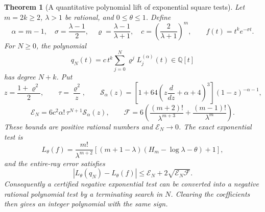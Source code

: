 \documentclass[11pt,a4paper]{article}
\newtheorem{theorem}{Theorem}[section]
\theoremstyle{definition}
\theoremstyle{remark}
\begin{document}
\begin{theorem}[A quantitative polynomial lift of exponential square tests]
\label{sea-square-exponential-lift}
Let $m=2k\ge2$, $\lambda>1$ be rational, and $0\le\theta\le1$.  Define
\[
 \alpha=m-1,\quad \sigma=\frac{\lambda-1}{2},\quad
 \varrho=\frac{\lambda-1}{\lambda+1},\quad
 c=\left(\frac{2}{\lambda+1}\right)^m,
 \qquad f(t)=t^k e^{-\sigma t}.
\]
For $N\ge0$, the polynomial
\[
 q_N(t)=c\,t^k\sum_{j=0}^N\varrho^jL_j^{(\alpha)}(t)
 \in\mathbb Q[t]
\]
has degree $N+k$.  Put
\[
 z=\frac{1+\varrho^2}{2},\qquad \tau=\frac{\varrho^2}{z},\qquad
 \mathcal S_\alpha(z)=
 \left[1+64\left(z\frac{d}{dz}+\alpha+4\right)^3\right]
 (1-z)^{-\alpha-1},
\]
\[
 \mathcal E_N=6c^2\alpha!\,\tau^{N+1}\mathcal S_\alpha(z),\qquad
 \mathcal F=6\left(\frac{(m+2)!}{\lambda^{m+3}}
                    +\frac{(m-1)!}{\lambda^m}\right).
\]
These bounds are positive rational numbers and $\mathcal E_N\to0$.
The exact exponential test is
\begin{equation}
 L_\theta(f)=\frac{m!}{\lambda^{m+2}}
 \left[(m+1-\lambda)(H_m-\log\lambda-\theta)+1\right],
 \label{sea-square-exponential-test}
\end{equation}
and the entire-ray error satisfies
\begin{equation}
 |L_\theta(q_N)-L_\theta(f)|
 \le \mathcal E_N+2\sqrt{\mathcal E_N\mathcal F}.
 \label{sea-square-lift-error}
\end{equation}
Consequently a certified negative exponential test can be converted into a
negative rational polynomial test by a terminating search in $N$.  Clearing
the coefficients then gives an integer polynomial with the same sign.
\end{theorem}
\end{document}
